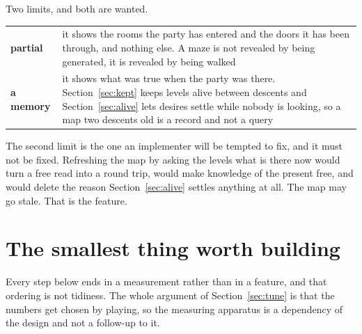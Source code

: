 \documentclass[11pt,a4paper]{article}
\begin{document}
Two limits, and both are wanted.

\begin{center}
\begin{tabular}{@{}l@{\hspace{4mm}}>{\raggedright\arraybackslash}p{}@{}}
\toprule
\textbf{partial} & it shows the rooms the party has entered and the doors it has been through, and
nothing else. A maze is not revealed by being generated, it is revealed by being walked \\[1mm]
\textbf{a memory} & it shows what was true when the party was there. Section~\ref{sec:kept} keeps
levels alive between descents and Section~\ref{sec:alive} lets desires settle while nobody is
looking, so a map two descents old is a record and not a query \\
\bottomrule
\end{tabular}
\end{center}

\begin{alarmbox}
The second limit is the one an implementer will be tempted to fix, and it must not be fixed.
Refreshing the map by asking the levels what is there now would turn a free read into a round trip,
would make knowledge of the present free, and would delete the reason
Section~\ref{sec:alive} settles anything at all. The map may go stale. That is the feature.
\end{alarmbox}

\section{The smallest thing worth building}
\label{sec:smallest}

Every step below ends in a measurement rather than in a feature, and that ordering is not
tidiness. The whole argument of Section~\ref{sec:tune} is that the numbers get chosen by playing,
so the measuring apparatus is a dependency of the design and not a follow-up to it.
\end{document}
